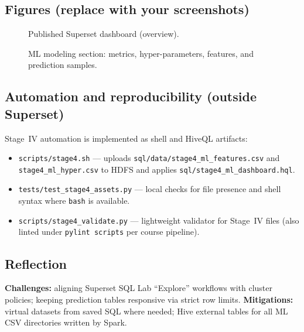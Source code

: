 \subsection{Figures (replace with your screenshots)}
\begin{figure}[htbp]
  \centering
  \caption{Published Superset dashboard (overview).}
  \label{fig:stage4-full}
\end{figure}

\begin{figure}[htbp]
  \centering
  \caption{ML modeling section: metrics, hyper-parameters, features, and prediction samples.}
  \label{fig:stage4-ml}
\end{figure}

\subsection{Automation and reproducibility (outside Superset)}
Stage~IV automation is implemented as shell and HiveQL artifacts:
\begin{itemize}
  \item \texttt{scripts/stage4.sh} --- uploads \texttt{sql/data/stage4\_ml\_features.csv} and \texttt{stage4\_ml\_hyper.csv} to HDFS and applies \texttt{sql/stage4\_ml\_dashboard.hql}.
  \item \texttt{tests/test\_stage4\_assets.py} --- local checks for file presence and shell syntax where \texttt{bash} is available.
  \item \texttt{scripts/stage4\_validate.py} --- lightweight validator for Stage~IV files (also linted under \texttt{pylint scripts} per course pipeline).
\end{itemize}

\subsection{Reflection}
\textbf{Challenges:} aligning Superset SQL Lab ``Explore'' workflows with cluster policies; keeping prediction tables responsive via strict row limits. \textbf{Mitigations:} virtual datasets from saved SQL where needed; Hive external tables for all ML CSV directories written by Spark.

